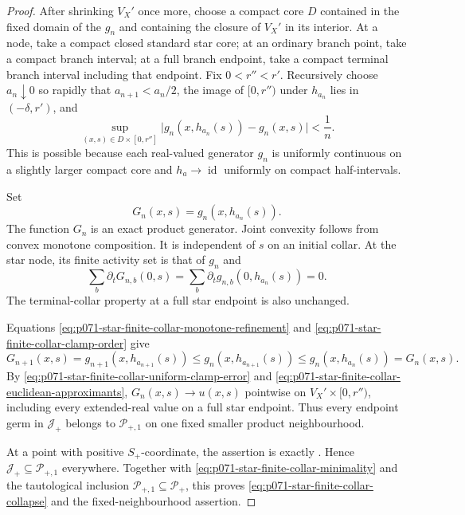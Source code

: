 \begin{proof}
After shrinking $V_X'$ once more, choose a compact core $D$ contained in
the fixed domain of the $g_n$ and containing the closure of $V_X'$ in its
interior.  At a node, take a compact closed standard star core; at an
ordinary branch point, take a compact branch interval; at a full branch
endpoint, take a compact terminal branch interval including that endpoint.
Fix $0<r''<r'$.  Recursively
choose $a_n\downarrow0$ so rapidly that $a_{n+1}<a_n/2$, the image of
$[0,r'')$ under $h_{a_n}$ lies in $(-\delta,r')$, and
\begin{equation}
 \sup_{(x,s)\in D\times[0,r'']}
    \bigl|g_n(x,h_{a_n}(s))-g_n(x,s)\bigr|<\frac1n.
\label{eq:p071-star-finite-collar-uniform-clamp-error}
\end{equation}
This is possible because each real-valued generator $g_n$ is uniformly
continuous on a slightly larger compact core and $h_a\to\operatorname{id}$
uniformly on compact half-intervals.

Set
\begin{equation}
                     G_n(x,s)=g_n(x,h_{a_n}(s)).
\label{eq:p071-star-finite-collar-final-approximants}
\end{equation}
The function $G_n$ is an exact product generator.  Joint convexity follows
from convex monotone composition.  It is independent of $s$ on an initial
collar.  At the star node, its finite activity set is that of $g_n$ and
\[
 \sum_b\partial_tG_{n,b}(0,s)
   =\sum_b\partial_tg_{n,b}(0,h_{a_n}(s))=0.
\]
The terminal-collar property at a full star endpoint is also unchanged.

Equations
\eqref{eq:p071-star-finite-collar-monotone-refinement} and
\eqref{eq:p071-star-finite-collar-clamp-order} give
\[
 G_{n+1}(x,s)
 =g_{n+1}(x,h_{a_{n+1}}(s))
 \leq g_n(x,h_{a_{n+1}}(s))
 \leq g_n(x,h_{a_n}(s))=G_n(x,s).
\]
By \eqref{eq:p071-star-finite-collar-uniform-clamp-error} and
\eqref{eq:p071-star-finite-collar-euclidean-approximants},
$G_n(x,s)\to u(x,s)$ pointwise on
$V_X'\times[0,r'')$, including every extended-real value on a full star
endpoint.  Thus every endpoint germ in $\mathcal J_+$ belongs to
$\mathcal P_{+,1}$ on one fixed smaller product neighbourhood.

At a point with positive $S_+$-coordinate, the assertion is exactly
.  Hence
$\mathcal J_+\subseteq\mathcal P_{+,1}$ everywhere.  Together with
\eqref{eq:p071-star-finite-collar-minimality} and the tautological
inclusion $\mathcal P_{+,1}\subseteq\mathcal P_+$, this proves
\eqref{eq:p071-star-finite-collar-collapse} and the fixed-neighbourhood
assertion.
\end{proof}
